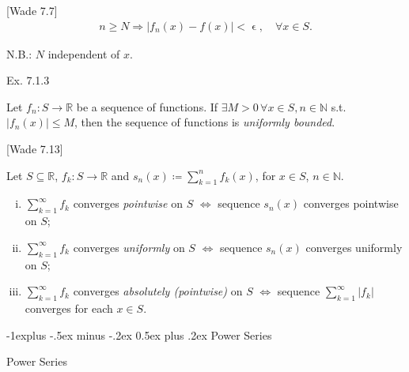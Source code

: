 \documentclass[10pt]{article} %
\makeatletter
\newcommand{\cw}[1]{[Wade #1]}
\renewcommand{\leq}{\leqslant}
\renewcommand{\geq}{\geqslant}
\renewcommand{\subsection}{\@startsection{subsection}{2}{0mm}%
                                {-1explus -.5ex minus -.2ex}%
                                {0.5ex plus .2ex}%
                                {\normalfont\normalsize\bfseries}}
\makeatother
\begin{document}
\begin{multicols}{3}
\begin{definition}{\cw{7.7}}{}
        \begin{align*}
            n \geq N \Rightarrow |f_n(x) - f(x)| < \upvarepsilon, \quad \forall x \in S.
        \end{align*}

    N.B.: $N$ independent of $x$.

\end{definition}

\begin{definition}{}{Ex. 7.1.3}

    Let $f_n: S \to \mathbb{R}$ be a sequence of functions. If $\exists M > 0 \, \forall x \in S, n \in \mathbb{N}$ s.t. $|f_n(x)| \leq M$, then the sequence of functions is \emph{uniformly bounded}.

\end{definition}

\begin{definition}{\cw{7.13}}{}

    Let $S \subseteq \mathbb{R}$, $f_k: S \to \mathbb{R}$ and $s_n(x) \coloneqq \sum_{k = 1}^n f_k(x)$, for $x \in S$, $n \in \mathbb{N}$.

        \begin{enumerate}[i)]
            \setlength{\parskip}{0em}
            \item $\sum_{k=1}^{\infty} f_k$ converges \emph{pointwise} on $S$ $\Leftrightarrow$ sequence $s_n(x)$ converges pointwise on $S$;
            \item $\sum_{k=1}^{\infty} f_k$ converges \emph{uniformly} on $S$ $\Leftrightarrow$ sequence $s_n(x)$ converges uniformly on $S$;
            \item $\sum_{k=1}^{\infty} f_k$ converges \emph{absolutely (pointwise)} on $S$ $\Leftrightarrow$ sequence $\sum_{k=1}^{\infty} |f_k|$ converges for each $x \in S$.
        \end{enumerate}

\end{definition}


\subsection{Power Series}

\begin{definition}{}{Power Series}


\end{definition}
\end{multicols}
\end{document}
